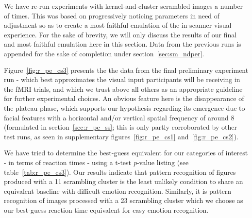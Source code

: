 	    We have re-run experiments with kernel-and-cluster scrambled images a number of times.
	    This was based on progressively noticing parameters in need of adjustment so as to create a most faithful emulation of the in-scanner visual experience.
	    For the sake of brevity, we will only discuss the results of our final and most faithful emulation here in this section.
	    Data from the previous runs is appended for the sake of completion under section~\ref{sec:sm_ndper}.
	     
	    
	    Figure~\ref{fig:r_pe_cs3} presents the the data from the final preliminary experiment run - which best approximates the visual input participants will be receiving in the fMRI trials, and which we trust above all others as an appropriate guideline for further experimental choices.
	    An obvious feature here is the disappearance of the plateau phase, which supports our hypothesis regarding its emergence due to facial features with a horizontal and/or vertical spatial frequency of around \SI{8}{\pixel} (formulated in section~\ref{sec:r_pe_ss}; this is only partly corroborated by other test runs, as seen in supplementary figures~\ref{fig:r_pe_cs1} and~\ref{fig:r_pe_cs2}).
	    
	    We have tried to determine the best-guess equivalent for our categories of interest - in terms of reaction times - using a t-test \textit{p}-value listing (see table~\ref{tab:r_pe_cs3}).
	    Our results indicate that pattern recognition of figures produced with a \SI{11}{\pixel} scrambling cluster is the least unlikely condition to share an equivalent baseline with difficult emotion recognition.
	    Similarly, it is pattern recognition of images processed with a \SI{23}{\pixel} scrambling cluster which we choose as our best-guess reaction time equivalent for easy emotion recognition.
	    

